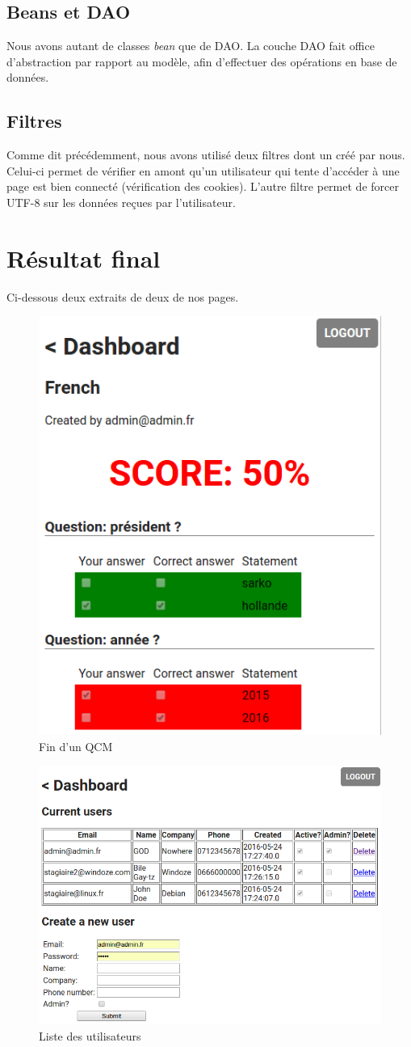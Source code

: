 \subsection{Beans et DAO}

Nous avons autant de classes \textit{bean} que de DAO. La couche DAO fait office d'abstraction par rapport au modèle, afin d'effectuer des opérations en base de données.

\subsection{Filtres}

Comme dit précédemment, nous avons utilisé deux filtres dont un créé par nous. Celui-ci permet de vérifier en amont qu'un utilisateur qui tente d'accéder à une page est bien connecté (vérification des cookies). L'autre filtre permet de forcer UTF-8 sur les données reçues par l'utilisateur.

\section{Résultat final}

Ci-dessous deux extraits de deux de nos pages.

\begin{figure}[H]
    \centering\includegraphics[width=.50\textwidth]{images/1.png}
    \caption{Fin d'un QCM}
\end{figure}

\begin{figure}[H]
    \centering\includegraphics[width=.80\textwidth]{images/2.png}
    \caption{Liste des utilisateurs}
\end{figure}

